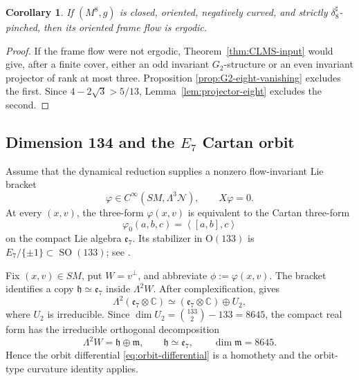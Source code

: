 \documentclass[reqno,11pt]{amsart}
\newtheorem{corollary}[theorem]{Corollary}
\theoremstyle{definition}
\newcommand{\SM}{SM}
\newcommand{\cN}{\mathcal N}
\newcommand{\SO}{\operatorname{SO}}
\newcommand{\bbC}{\mathbb C}
\newcommand{\inner}[2]{\left\langle #1,#2\right\rangle}
\begin{document}
\begin{corollary}
\label{cor:dimension-eight-threshold}
If $(M^8,g)$ is closed, oriented, negatively curved, and strictly
$\delta_8^\sharp$-pinched, then its oriented frame flow is ergodic.
\end{corollary}

\begin{proof}
If the frame flow were not ergodic, Theorem~\ref{thm:CLMS-input} would give,
after a finite cover, either an odd invariant $G_2$-structure or an even
invariant projector of rank at most three.  Proposition
\ref{prop:G2-eight-vanishing} excludes the first.  Since
$4-2\sqrt3>5/13$, Lemma~\ref{lem:projector-eight} excludes the second.
\end{proof}

\subsection{Dimension 134 and the \texorpdfstring{$E_7$}{E7} Cartan orbit}
\label{sec:dimension-134}

Assume that the dynamical reduction supplies a nonzero flow-invariant Lie
bracket
\begin{equation*}
 \varphi\in C^\infty(\SM,\Lambda^3\cN),
 \qquad X\varphi=0.
\end{equation*}
At every $(x,v)$, the three-form $\varphi(x,v)$ is equivalent to the Cartan
three-form
\begin{equation*}
 \varphi_0(a,b,c)=\inner{[a,b]}c
\end{equation*}
on the compact Lie algebra $\mathfrak e_7$.  Its stabilizer in
$\mathrm O(133)$ is $E_7/\{\pm1\}\subset\SO(133)$; see
\cite[Theorem~3.8 and Lemma~3.12]{CLMS24}.

Fix $(x,v)\in\SM$, put $W=v^\perp$, and abbreviate
$\phi:=\varphi(x,v)$.  The bracket identifies a copy
$\mathfrak h\simeq\mathfrak e_7$ inside $\Lambda^2W$.  After
complexification, \cite[Proposition~5.1]{Reeder97} gives
$$
 \Lambda^2(\mathfrak e_7\otimes\bbC)
 \simeq(\mathfrak e_7\otimes\bbC)\oplus U_2,
$$
where $U_2$ is irreducible.  Since
$\dim U_2=\binom{133}{2}-133=8645$, the compact real form has the
irreducible orthogonal decomposition
\begin{equation*}
 \Lambda^2W=\mathfrak h\oplus\mathfrak m,
 \qquad
 \mathfrak h\simeq\mathfrak e_7,
 \qquad
 \dim\mathfrak m=8645.
\end{equation*}
Hence the orbit differential \eqref{eq:orbit-differential} is a homothety
and the orbit-type curvature identity applies.
\end{document}
